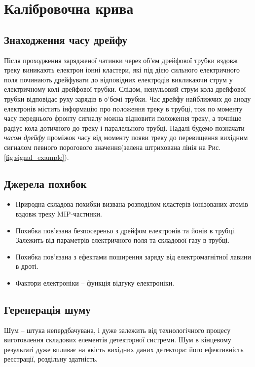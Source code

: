 \documentclass[]{article}
\begin{document}
	
	\section{Калібровочна крива}
	
	\subsection{Знаходження часу дрейфу}
	Після проходження зарядженої чатинки через об’єм дрейфової трубки вздовж треку виникають електрон іонні кластери, які під дією сильного електричного поля починають дрейфувати до відповідних електродів викликаючи струм у електричному колі дрейфової трубки. Слідом, ненульовий струм кола дрейфової трубки відповідає руху зарядів в о’бємі трубки. Час дрейфу найближчих до аноду електронів містить інформацію про положення треку в трубці, тож по моменту часу переднього фронту сигналу можна відновити положення треку, а точніше радіус кола дотичного до треку і паралельного трубці. Надалі будемо позначати {\it часом дрейфу} проміжок часу від моменту появи треку до перевищення вихідним сигналом певного порогового значення(зелена штрихована лінія на Рис. \ref{fig:signal_example}).
	
	\subsection{Джерела похибок}
	
	\begin{itemize}
		\item Природна складова похибки визвана розподілом кластерів іонізованих атомів вздовж треку MIP-частинки.\par
		\item Похибка пов’язана безпосереньо з дрейфом електронів та йонів в трубці. Залежить від параметрів електричного поля та складової газу в трубці.
		\item Похибка пов’язана з ефектами поширення заряду від електромагнітної лавини в дроті.
		\item Фактори електроніки -- функція відгуку електроніки.
	\end{itemize}
	
	\subsection{Геренерація шуму}
	Шум -- штука непердбачувана, і дуже залежить від технологічного процесу виготовлення складових елементів детекторної систреми. Шум в кінцевому результаті дуже впливає на якість вихідних даних детектора: його ефективність реєстрації, роздільну здатність.
	
\end{document}
